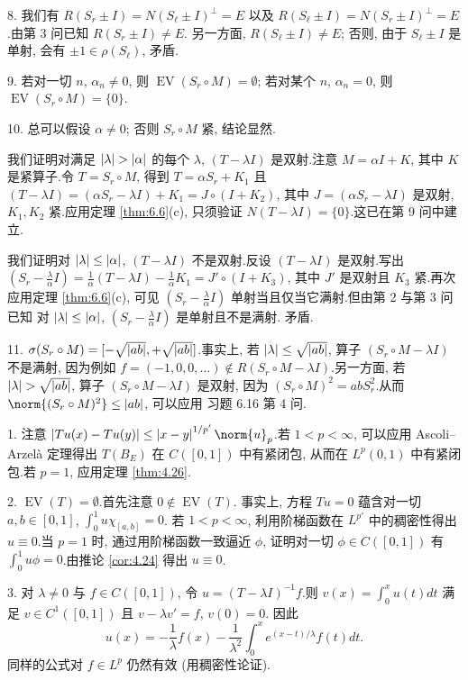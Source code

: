 8. 我们有 $R(S_r\pm I)=N(S_\ell\pm I)^\perp=E$ 以及
$R(S_\ell\pm I)=N(S_r\pm I)^\perp=E$.由第 3 问已知 $R(S_r\pm I)\ne E$.
另一方面, $R(S_\ell\pm I)\ne E$; 否则, 由于 $S_\ell\pm I$ 是单射, 会有
$\pm1\in\rho(S_\ell)$, 矛盾.

9. 若对一切 $n$, $\alpha_n\ne0$, 则 $\operatorname{EV}(S_r\circ M)=\emptyset$;
若对某个 $n$, $\alpha_n=0$, 则 $\operatorname{EV}(S_r\circ M)=\{0\}$.

10. 总可以假设 $\alpha\ne0$; 否则 $S_r\circ M$ 紧, 结论显然.

我们证明对满足 $\abs{\lambda}>\abs{\alpha}$ 的每个 $\lambda$, $(T-\lambda I)$
是双射.注意 $M=\alpha I+K$, 其中 $K$ 是紧算子.令 $T=S_r\circ M$, 得到
$T=\alpha S_r+K_1$ 且 $(T-\lambda I)=(\alpha S_r-\lambda I)+K_1=J\circ(I+K_2)$,
其中 $J=(\alpha S_r-\lambda I)$ 是双射, $K_1,K_2$ 紧.应用定理  \ref{thm:6.6}(c),
只须验证 $N(T-\lambda I)=\{0\}$.这已在第 9 问中建立.

我们证明对 $\left|\lambda\right|\le\left|\alpha\right|$, $(T-\lambda I)$ 不是双射.反设
$(T-\lambda I)$ 是双射.写出
$(S_r-\frac\lambda\alpha I)=\frac1\alpha(T-\lambda I)-\frac1\alpha K_1=J'\circ(I+K_3)$,
其中 $J'$ 是双射且 $K_3$ 紧.再次应用定理  \ref{thm:6.6}(c), 可见
$(S_r-\frac\lambda\alpha I)$ 单射当且仅当它满射.但由第 2 与第 3 问已知
对 $\left|\lambda\right|\le\left|\alpha\right|$, $(S_r-\frac\lambda\alpha I)$ 是单射且不是满射.
矛盾.

11. $\sigma(S_r\circ M)=[-\sqrt{\left|ab\right|},+\sqrt{\left|ab\right|}]$.事实上, 若
$\left|\lambda\right|\le\sqrt{\left|ab\right|}$, 算子 $(S_r\circ M-\lambda I)$ 不是满射,
因为例如 $f=(-1,0,0,\dots)\notin R(S_r\circ M-\lambda I)$.另一方面, 若
$\abs{\lambda}>\sqrt{\abs{ab}}$, 算子 $(S_r\circ M-\lambda I)$ 是双射, 因为
$(S_r\circ M)^2=abS_r^2$.从而 $\norm{(S_r\circ M)^2}\le\abs{ab}$, 可以应用
习题 6.16 第 4 问.


1. 注意 $\abs{Tu(x)-Tu(y)}\le\abs{x-y}^{1/p'}\norm{u}_p$.若 $1<p<\infty$,
可以应用 Ascoli--Arzelà 定理得出 $T(B_E)$ 在 $C([0,1])$ 中有紧闭包, 从而在
$L^p(0,1)$ 中有紧闭包.若 $p=1$, 应用定理  \ref{thm:4.26}.

2. $\operatorname{EV}(T)=\emptyset$.首先注意 $0\notin\operatorname{EV}(T)$.
事实上, 方程 $Tu=0$ 蕴含对一切 $a,b\in[0,1]$, $\int_0^1u\chi_{[a,b]}=0$.
若 $1<p<\infty$, 利用阶梯函数在 $L^{p'}$ 中的稠密性得出 $u\equiv0$.当 $p=1$
时, 通过用阶梯函数一致逼近 $\phi$, 证明对一切 $\phi\in C([0,1])$ 有
$\int_0^1u\phi=0$.由推论  \ref{cor:4.24} 得出 $u\equiv0$.

3. 对 $\lambda\ne0$ 与 $f\in C([0,1])$, 令 $u=(T-\lambda I)^{-1}f$.则
$v(x)=\int_0^xu(t)dt$ 满足 $v\in C^1([0,1])$ 且 $v-\lambda v'=f$, $v(0)=0$.
因此
\begin{equation*}
u(x)=-\frac1\lambda f(x)-\frac{1}{\lambda^2}\int_0^xe^{(x-t)/\lambda}f(t)dt.
\end{equation*}
同样的公式对 $f\in L^p$ 仍然有效 (用稠密性论证).

